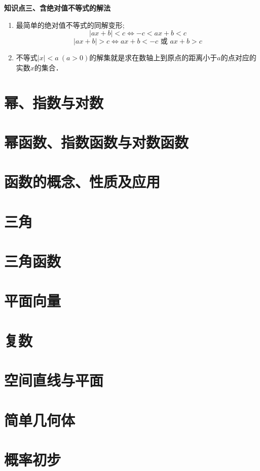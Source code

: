 \documentclass[11pt,a4paper]{ctexbook}
\begin{document}
\begin{formal}
    {\large \textbf{知识点三、含绝对值不等式的解法}}
\end{formal}

\begin{enumerate}
    \item 最简单的绝对值不等式的同解变形;
    $$
    |ax+b|<c \Leftrightarrow -c<ax+b<c 
    $$
    $$
    |ax+b|>c \Leftrightarrow ax+b<-c \text{\  或 \ }  ax+b>c
    $$
    \item 不等式$ |x|<a\ (a>0)$的解集就是求在数轴上到原点的距离小于$a$的点对应的实数$x$的集合．

\end{enumerate}
\clearpage



\chapter{幂、指数与对数}

\chapter{幂函数、指数函数与对数函数}
\chapter{函数的概念、性质及应用}
\chapter{三角}
\chapter{三角函数}
\chapter{平面向量}
\chapter{复数}
\chapter{空间直线与平面}
\chapter{简单几何体}
\chapter{概率初步}
\end{document}

